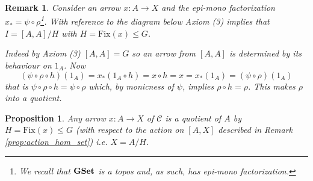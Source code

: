 \documentclass[italian, 12pt, reqno]{article}
\theoremstyle{myteo}
\newtheorem{proposition}[theorem]{Proposition}
\newtheorem{remark}[theorem]{Remark}
\numberwithin{equation}{section}
\newcommand{\cat}[1]{\mathscr{#1}}
\newcommand{\gset}{\text{\textbf{GSet}}}
\newcommand{\fix}[1]{\text{Fix}(#1)}
\newcommand{\homs}[2]{[#1, #2]}
\newcommand{\fun}[3]{#1\colon#2\to #3}
\begin{document}
\begin{remark}
  \label{rem:axiom2}
  Consider an arrow \(\fun{x}{A}{X}\) and the epi-mono factorization \(x_* = \psi\circ \rho\)\footnote{We recall that \(\gset\) is a topos and, as such, has epi-mono factorization.}.
  With reference to the diagram below Axiom (3) implies that \(I = \homs{A}{A}/H\) with \(H = \fix{x}\leq G\).

  \begin{center}
  \end{center}

	Indeed by Axiom (3) \(\homs{A}{A} = G\) so an arrow from \(\homs{A}{A}\) is determined by its behaviour on \(1_A\).
	Now
	\[(\psi\circ\rho\circ h)(1_A) = x_*(1_A\circ h) = x\circ h = x = x_*(1_A) = (\psi\circ\rho)(1_A)\]
  that is \(\psi\circ\rho\circ h = \psi\circ\rho\) which, by monicness of \(\psi\), implies \(\rho\circ h = \rho\).
	This makes \(\rho\) into a quotient.
\end{remark}

\begin{proposition}
  \label{prop:epsilon_iso}
  Any arrow \(\fun{x}{A}{X}\) of \(\cat{C}\) is a quotient of \(A\) by \(H = \fix{x}\leq G\) (with respect to the action on \(\homs{A}{X}\) described in Remark \ref{prop:action_hom_set}) i.e. \(X = A/H\).
\end{proposition}
\end{document}
